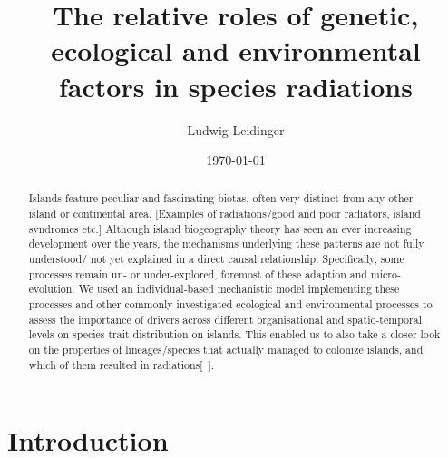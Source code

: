 \documentclass[a4paper]{scrartcl}
\title{The relative roles of genetic, ecological and environmental factors in species radiations}
\author{Ludwig Leidinger}
\date{\today}
\begin{document}
\maketitle

\begin{abstract}
  Islands feature peculiar and fascinating biotas, often very distinct from any other island or continental area.
  [Examples of radiations/good and poor radiators, island syndromes etc.]
  Although island biogeography theory has seen an ever increasing development over the years,
  the mechanisms underlying these patterns are not fully understood/ not yet explained in a direct causal relationship.
  Specifically, some processes remain un- or under-explored, foremost of these adaption and micro-evolution.
  We used an individual-based mechanistic model implementing these processes and other commonly investigated ecological and
  environmental processes to assess the importance of drivers across different organisational and spatio-temporal levels
  on species trait distribution on islands.
  This enabled us to also take a closer look on the properties of lineages/species that actually managed to colonize islands,
  and which of them resulted in radiations[~].
  
  
\end{abstract}

\section{Introduction}



\end{document}
